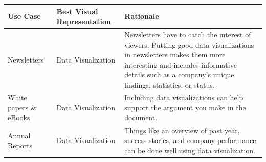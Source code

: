 \documentclass[]{book}
\begin{document}
\begin{longtable}[]{@{}lll@{}}
\toprule
\begin{minipage}[b]{0.09\columnwidth}\raggedright\strut
Use Case\strut
\end{minipage} & \begin{minipage}[b]{0.26\columnwidth}\raggedright\strut
Best Visual Representation\strut
\end{minipage} & \begin{minipage}[b]{0.57\columnwidth}\raggedright\strut
Rationale\strut
\end{minipage}\tabularnewline
\midrule
\endhead
\begin{minipage}[t]{0.09\columnwidth}\raggedright\strut
Newsletters\strut
\end{minipage} & \begin{minipage}[t]{0.26\columnwidth}\raggedright\strut
Data Visualization\strut
\end{minipage} & \begin{minipage}[t]{0.57\columnwidth}\raggedright\strut
Newsletters have to catch the interest of viewers. Putting good data
visualizations in newsletters makes them more interesting and includes
informative details such as a company's unique findings, statistics, or
status.\strut
\end{minipage}\tabularnewline
\begin{minipage}[t]{0.09\columnwidth}\raggedright\strut
White papers \& eBooks\strut
\end{minipage} & \begin{minipage}[t]{0.26\columnwidth}\raggedright\strut
Data Visualization\strut
\end{minipage} & \begin{minipage}[t]{0.57\columnwidth}\raggedright\strut
Including data visualizations can help support the argument you make in
the document.\strut
\end{minipage}\tabularnewline
\begin{minipage}[t]{0.09\columnwidth}\raggedright\strut
Annual Reports\strut
\end{minipage} & \begin{minipage}[t]{0.26\columnwidth}\raggedright\strut
Data Visualization\strut
\end{minipage} & \begin{minipage}[t]{0.57\columnwidth}\raggedright\strut
Things like an overview of past year, success stories, and company
performance can be done well using data visualization.\strut
\end{minipage}\tabularnewline

\end{longtable}
\end{document}
